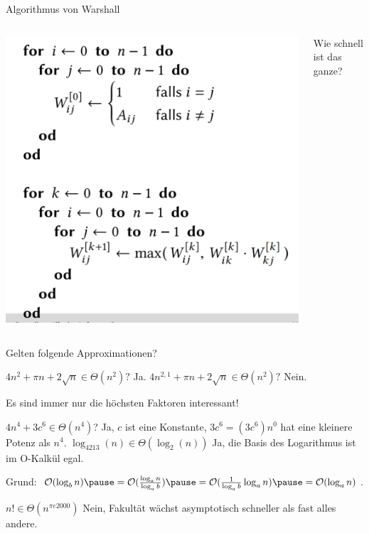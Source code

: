 \documentclass[]{beamer}
\begin{document}
\begin{frame}{Algorithmus von Warshall}
	\begin{columns}
		\begin{column}{0.7\textwidth}
			\includegraphics[scale=0.5]{images/warshall.png}\\
		\end{column}
		\begin{column}{0.3\textwidth}
			Wie schnell ist das ganze?
		\end{column}
	\end{columns}
\end{frame}

\begin{frame}
Gelten folgende Approximationen?

\begin{itemize}
	\pitem $4n^2 + \pi n + 2 \sqrt{n} \in \Theta(n^2)?$ \pause Ja.
	\pitem $4n^{2,1} + \pi n + 2 \sqrt{n} \in \Theta(n^2)?$ \pause Nein.
\end{itemize}

\bp Es sind immer nur die höchsten Faktoren interessant!

\begin{itemize}
	\pitem $4n^4 + 3c^6 \in \Theta(n^4)$? \pause Ja\ip, $c$ ist eine Konstante, $3c^6=(3c^6)n^0$ hat eine kleinere Potenz als $n^4$.
	\pitem $\log_{4213}(n) \in \Theta(\log_2(n))$ \pause Ja\ip, die Basis des Logarithmus ist im O-Kalkül egal.
	
	\begin{itemize}
		\pitem Grund: $\okalk(\log_b n) \ip= \okalk(\frac{\log_a n}{\log_a b}) \ip = \okalk(\frac{1}{\log_a b}\log_a n) \ip = \okalk(\log_a n)$.
	\end{itemize}
	
	\pitem $n! \in \Theta(n^{\pi e 2000})$ \pause Nein\ip, Fakultät wächst asymptotisch schneller als fast alles andere.
\end{itemize}
\end{frame}
\end{document}
